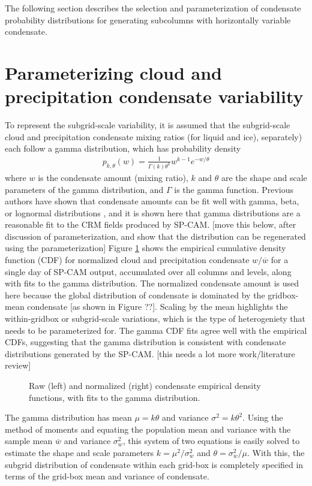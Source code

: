The following section describes the selection and parameterization of condensate probability distributions for generating subcolumns with horizontally variable condensate.

\section{Parameterizing cloud and precipitation condensate variability}
\label{subgrid2_variability_section}
To represent the subgrid-scale variability, it is assumed that the subgrid-scale cloud and precipitation condensate mixing ratios (for liquid and ice), separately) each follow a gamma distribution, which has probability density
\begin{gather}
    p_{k, \theta}(w) = \frac{1}{\Gamma(k) \theta^k} w^{k - 1} e^{-w/\theta}
\end{gather}
where $w$ is the condensate amount (mixing ratio), $k$ and $\theta$ are the shape and scale parameters of the gamma distribution, and $\Gamma$ is the gamma function. Previous authors have shown that condensate amounts can be fit well with gamma, beta, or lognormal distributions \citep[e.g.,][]{lee_et_al_2010}, and it is shown here that gamma distributions are a reasonable fit to the CRM fields produced by SP-CAM. [move this below, after discussion of parameterization, and show that the distribution can be regenerated using the parameterization] Figure \ref{sgi_condensate_cdf} shows the empirical cumulative density function (CDF) for normalized cloud and precipitation condensate $w / \overline{w}$ for a single day of SP-CAM output, accumulated over all columns and levels, along with fits to the gamma distribution. The normalized condensate amount is used here because the global distribution of condensate is dominated by the gridbox-mean condensate [as shown in Figure ??]. Scaling by the mean highlights the within-gridbox or subgrid-scale variations, which is the type of heterogeniety that needs to be parameterized for. The gamma CDF fits agree well with the empirical CDFs, suggesting that the gamma distribution is consistent with condensate distributions generated by the SP-CAM. [this needs a lot more work/literature review]
\begin{figure}
\centering
\caption{Raw (left) and normalized (right) condensate empirical density functions, with fits to the gamma distribution.}
\label{sgi_condensate_cdf}
\end{figure}

The gamma distribution has mean $\mu = k\theta$ and variance $\sigma^2 = k \theta^2$. Using the method of moments \citep[e.g.,][]{wilks_2011} and equating the population mean and variance with the sample mean $\overline{w}$ and variance $\sigma_w^2$, this system of two equations is easily solved to estimate the shape and scale parameters $k = \mu^2 / \sigma_w^2$ and $\theta = \sigma_w^2 / \mu$. With this, the subgrid distribution of condensate within each grid-box is completely specified in terms of the grid-box mean and variance of condensate.

